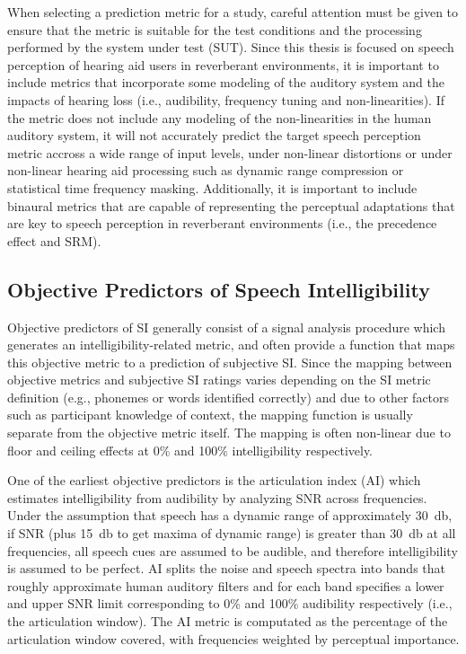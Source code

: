 When selecting a prediction metric for a study, careful attention must be given to ensure that the metric is suitable for the test conditions and the processing performed by the system under test (SUT). Since this thesis is focused on speech perception of hearing aid users in reverberant environments, it is important to include metrics that incorporate some modeling of the auditory system and the impacts of hearing loss (i.e., audibility, frequency tuning and non-linearities). If the metric does not include any modeling of the non-linearities in the human auditory system, it will not accurately predict the target speech perception metric accross a wide range of input levels, under non-linear distortions or under non-linear hearing aid processing such as dynamic range compression or statistical time frequency masking. Additionally, it is important to include binaural metrics that are capable of representing the perceptual adaptations that are key to speech perception in reverberant environments (i.e., the precedence effect and SRM).

\subsection{Objective Predictors of Speech Intelligibility} \label{section_si_metrics}

Objective predictors of SI generally consist of a signal analysis procedure which generates an intelligibility-related metric, and often provide a function that maps this objective metric to a prediction of subjective SI. Since the mapping between objective metrics and subjective SI ratings varies depending on the SI metric definition (e.g., phonemes or words identified correctly) and due to other factors such as participant knowledge of context, the mapping function is usually separate from the objective metric itself. The mapping is often non-linear due to floor and ceiling effects at 0\% and 100\% intelligibility respectively.

One of the earliest objective predictors is the articulation index (AI) \citep{kryter1962methods} which estimates intelligibility from audibility by analyzing SNR across frequencies. Under the assumption that speech has a dynamic range of approximately \qty{30}{\decibel}, if SNR (plus \qty{15}{\decibel} to get maxima of dynamic range) is greater than \qty{30}{\decibel} at all frequencies, all speech cues are assumed to be audible, and therefore intelligibility is assumed to be perfect. AI splits the noise and speech spectra into bands that roughly approximate human auditory filters and for each band specifies a lower and upper SNR limit corresponding to 0\% and 100\% audibility respectively (i.e., the articulation window). The AI metric is computated as the percentage of the articulation window covered, with frequencies weighted by perceptual importance.


